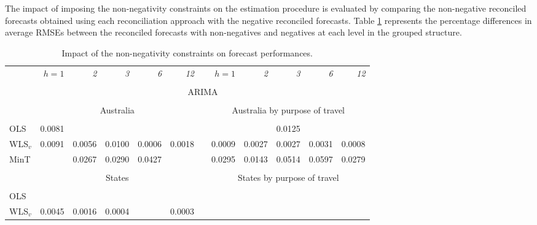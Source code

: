 \documentclass[11pt]{article}
\newcommand{\0}{\phantom{0}}
\begin{document}
The impact of imposing the non-negativity constraints on the estimation procedure is evaluated by comparing the non-negative reconciled forecasts obtained using each reconciliation approach with the negative reconciled forecasts. Table \ref{tbl:impactnn} represents the percentage differences in average RMSEs between the reconciled forecasts with non-negatives and negatives at each level in the grouped structure.

\begin{table}[p]
	\centering
	\fontsize{9}{12}\rm\tabcolsep=0.095cm
	\caption{Impact of the non-negativity constraints on forecast performances.}
	\label{tbl:impactnn}
	\begin{threeparttable}
		\begin{tabular}{lrrrrrrrrrrr}
			\toprule
			& \it{$h=1$} & \it{2} & \it{3} & \it{6} & \it{12} & & \it{$h=1$} & \it{2} & \it{3} & \it{6} & \it{12} \\\cline{2-6} \cline{8-12} \\[-0.3cm]
			& \multicolumn{11}{c}{ARIMA} \\
			\cline{2-12} \\[-0.3cm]
			& \multicolumn{5}{c}{Australia} & & \multicolumn{5}{c}{Australia by purpose of travel} \\
			\cline{2-6} \cline{8-12}\\[-0.3cm]
			OLS & 0.0081 & \bm{$-0.0138$} & \bm{$-0.0230$} & \bm{$-0.0094$} & \bm{$-0.0269$} & & \bm{$-0.0757$} & \bm{$-0.0503$} & 0.0125 & \bm{$-0.0065$} & \bm{$-0.0157$} \\
			WLS$_{v}$ & 0.0091 & 0.0056 & 0.0100 & 0.0006 & 0.0018 & & 0.0009 & 0.0027 & 0.0027 & 0.0031 & 0.0008 \\
			MinT & \bm{$-0.0090$} & 0.0267 & 0.0290 & 0.0427 & \bm{$-0.0222$} & & 0.0295 & 0.0143 & 0.0514 & 0.0597 & 0.0279 \\
			\cline{2-6} \cline{8-12}\\[-0.3cm]
			& \multicolumn{5}{c}{States} & & \multicolumn{5}{c}{States by purpose of travel} \\
			\cline{2-6} \cline{8-12}\\[-0.3cm]
			OLS & \bm{$-0.0560$} & \bm{$-0.0744$} & \bm{$-0.0543$} & \bm{$-0.0159$} & \bm{$-0.0904$} & & \bm{$-0.5054$} & \bm{$-0.8173$} & \bm{$-0.7670$} & \bm{$-0.8597$} & \bm{$-0.7745$} \\
			WLS$_{v}$ & 0.0045 & 0.0016 & 0.0004 & \bm{$-0.0077$} & 0.0003 & & \bm{$-0.0009$} & \bm{$-0.0004$} & \bm{$-0.0013$} & \bm{$-0.0023$} & \bm{$-0.0037$} \\

\end{tabular}
\end{threeparttable}
\end{table}
\end{document}
